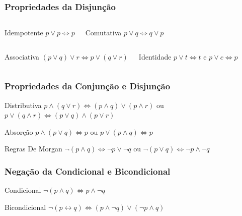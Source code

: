 \documentclass[aspectratio=169]{beamer} %
\begin{document}
\begin{frame}
\frametitle{Propriedades da Disjunção}

\begin{columns}[c]
	\large
\begin{block}{Idempotente}
	$p \vee p \Leftrightarrow p$
\end{block}

\begin{block}{Comutativa}
	$p \vee q \Leftrightarrow q \vee p$
\end{block}
\end{columns}\vfill

\begin{columns}[c]
	\large
\begin{block}{Associativa}
	$(p \vee q) \vee r \Leftrightarrow p \vee (q \vee r)$
\end{block}

\begin{block}{Identidade}
	$p \vee t \Leftrightarrow t$ e $p \vee c \Leftrightarrow p$
\end{block}
\end{columns}\vfill

\end{frame}

\begin{frame}
\frametitle{Propriedades da Conjunção e Disjunção}

\begin{block}{Distributiva}
$p \wedge (q \vee r) \Leftrightarrow (p \wedge q) \vee (p \wedge r)$ ou $p \vee (q \wedge r) \Leftrightarrow (p \vee q) \wedge (p \vee r)$
\end{block}\vfill

\begin{block}{Absorção}
$p \wedge (p \vee q) \Leftrightarrow p$ ou $p \vee (p \wedge q) \Leftrightarrow p$
\end{block}\vfill

\begin{block}{Regras De Morgan}
$\neg (p \wedge q) \Leftrightarrow \neg p \vee \neg q$ ou $\neg (p \vee q) \Leftrightarrow \neg p \wedge \neg q$
\end{block}
\end{frame}

\begin{frame}
\frametitle{Negação da Condicional e Bicondicional}

\begin{block}{Condicional}
$\neg (p \wedge q) \Leftrightarrow p \wedge \neg q$
\end{block}\vfill

\begin{block}{Bicondicional}
$\neg (p \leftrightarrow q) \Leftrightarrow (p \wedge \neg q) \vee (\neg p \wedge q)$
\end{block}
\end{frame}
\end{document}
